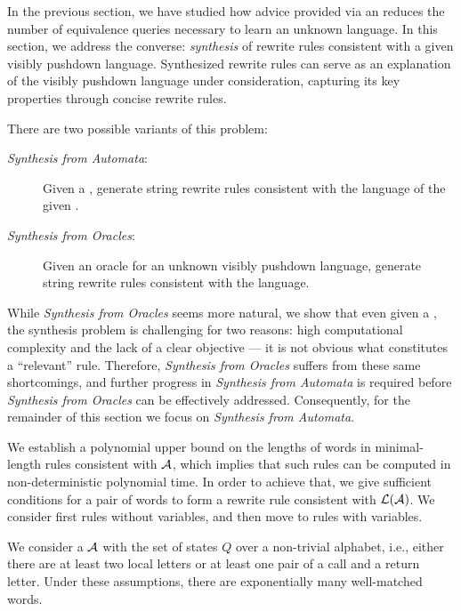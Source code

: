 In the previous section, 
we have studied how advice provided via an \SRS reduces the number of equivalence queries necessary to learn an unknown language.
In this section, we address the converse: \emph{synthesis} of rewrite rules consistent with a given visibly pushdown language. 
Synthesized rewrite rules can serve as an explanation of the visibly pushdown language under consideration, capturing its key properties through concise rewrite rules.

There are two possible variants of this problem:
\begin{description}
\item[\textit{Synthesis from Automata}:] Given a \DVPA, generate string rewrite rules consistent with the language of the given \DVPA.
\item[\textit{Synthesis from Oracles}:] Given an oracle for an unknown visibly pushdown language, generate string rewrite rules consistent with the language. 
\end{description}

While \textit{Synthesis from Oracles} seems more natural, we show that even given a \DVPA, the synthesis problem is challenging for two reasons: 
high computational complexity and the lack of a clear objective --- it is not obvious what constitutes a ``relevant'' rule. 
Therefore, \textit{Synthesis from Oracles} suffers from these same shortcomings, and further progress in \textit{Synthesis from Automata} is required before \textit{Synthesis from Oracles} can be effectively addressed.
Consequently, for the remainder of this section we focus on \textit{Synthesis from Automata}.



We establish a polynomial upper bound on the lengths of words in minimal-length rules consistent with $\mathcal{A}$, which implies that such rules
can be computed in non-deterministic polynomial time. 
In order to achieve that, we give  sufficient conditions for a pair of words to form a rewrite rule consistent with $\mathcal{L}(\mathcal{A})$.
We consider first rules without variables, and then move to rules with variables.

We consider a \DVPA $\mathcal{A}$ with the set of states $Q$ over a non-trivial alphabet, i.e., either there are at least two local letters or at least one pair of a call and a return letter.
Under these assumptions, there are exponentially many well-matched words.

